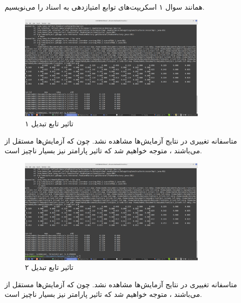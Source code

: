 \begin{boxM}
    همانند سوال ۱ اسکریپت‌های توابع امتیازدهی به اسناد را می‌نویسیم.
\end{boxM}


\begin{figure}[h]
    \centering
    \includegraphics[width=0.8\textwidth]{IR1/images/pln_1.png}
    \caption{تاثیر تابع تبدیل ۱}
    \label{fig:enter-label}
\end{figure}

\begin{boxM}
    متاسفانه تغییری در نتایج آزمایش‌ها مشاهده نشد.
    چون که آزمایش‌ها مستقل از
    می‌باشند ، 
    متوجه خواهیم شد که تاثیر پارامتر
    نیز بسیار ناچیز است.
\end{boxM}

\newpage

\begin{figure}[h]
    \centering
    \includegraphics[width=0.8\textwidth]{IR1/images/pln_2.png}
    \caption{تاثیر تابع تبدیل ۲}
    \label{fig:enter-label}
\end{figure}

\begin{boxM}
    متاسفانه تغییری در نتایج آزمایش‌ها مشاهده نشد.
    چون که آزمایش‌ها مستقل از
    می‌باشند ، 
    متوجه خواهیم شد که تاثیر پارامتر
    نیز بسیار ناچیز است.
\end{boxM}
